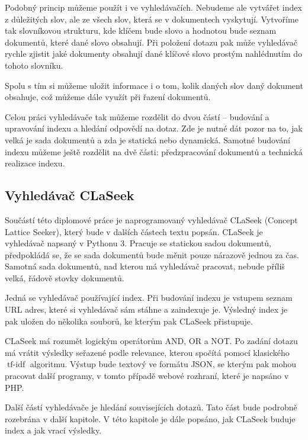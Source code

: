 \documentclass[12pt]{article}
\newcommand{\name}{CLaSeek}
\DeclareMathOperator{\tfidf}{tf-idf}
\begin{document}
Podobný princip můžeme použít i ve vyhledávačích. Nebudeme ale vytvářet index z důležitých slov, ale ze všech slov, která se v dokumentech vyskytují. Vytvoříme tak slovníkovou strukturu, kde klíčem bude slovo a hodnotou bude seznam dokumentů, které dané slovo obsahují. Při položení dotazu pak může vyhledávač rychle zjistit jaké dokumenty obsahují dané klíčové slovo prostým nahlédnutím do tohoto slovníku. 

Spolu s tím si můžeme uložit informace i o tom, kolik daných slov daný dokument obsahuje, což můžeme dále využít při řazení dokumentů. 

Celou práci vyhledávače tak můžeme rozdělit do dvou částí -- budování a upravování indexu a hledání odpovědí na dotaz. Zde je nutné dát pozor na to, jak velká je sada dokumentů a zda je statická nebo dynamická. Samotné budování indexu můžeme ještě rozdělit na dvě části: předzpracování dokumentů a technická realizace indexu. 

\subsection{Vyhledávač \name}

Součástí této diplomové práce je naprogramovaný vyhledávač \name{} (Concept Lattice Seeker), který bude v dalších částech textu popsán. \name{} je vyhledávač napsaný v Pythonu 3. Pracuje se statickou sadou dokumentů, předpokládá se, že se sada dokumentů bude měnit pouze nárazově jednou za čas. Samotná sada dokumentů, nad kterou má vyhledávač pracovat, nebude příliš velká, řádově stovky dokumentů. 

Jedná se vyhledávač používající index. Při budování indexu je vstupem seznam URL adres, které si vyhledávač sám stáhne a zaindexuje je. Výsledný index je pak uložen do několika souborů, ke kterým pak \name{} přistupuje. 

\name{} má rozumět logickým operátorům AND, OR a NOT. Po zadání dotazu má vrátit výsledky seřazené podle relevance, kterou spočítá pomocí klasického $\tfidf$ algoritmu. Výstup bude textový ve formátu JSON, se kterým pak mohou pracovat další programy, v tomto případě webové rozhraní, které je napsáno v PHP. 

Další částí vyhledávače je hledání souvisejících dotazů. Tato část bude podrobně rozebrána v další kapitole. V této kapitole je dále popsáno, jak \name{} buduje index a jak vrací výsledky. 

\end{document}
